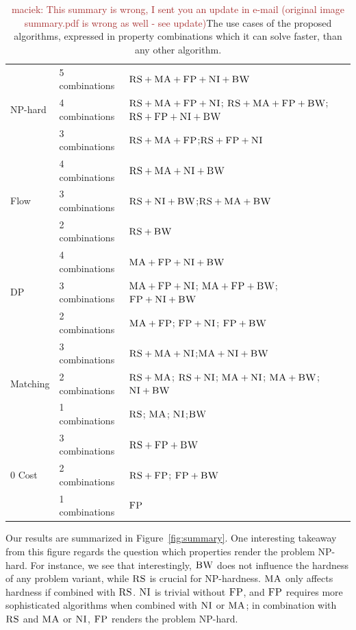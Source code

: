 \documentclass[9pt]{sigcomm-alternate}
\newcommand{\maciek}[1]{\textcolor{brown}{maciek: #1}}
\newcommand{\CC}{\textsc{NI}}
\newcommand{\FP}{\textsc{FP}}
\newcommand{\RS}{\textsc{RS}}
\newcommand{\BW}{\textsc{BW}}
\newcommand{\MA}{\textsc{MA}}
\begin{document}
\begin{table}


\begin{small}
\begin{tabular}{|l|l|p{4cm}|}
\hline
\multirow{3}{*}{NP-hard} & 5 combinations & \mbox{$\RS+\MA+\FP+\CC+\BW$}\\
\cline{2-3}
 & 4 combinations &  \mbox{$\RS+\MA+\FP+\CC$}; \mbox{$\RS+\MA+\FP+\BW$};
\mbox{$\RS+\FP+\CC+\BW$} \\ \cline{2-3}
 & 3 combinations &\mbox{$\RS+\MA+\FP$};\mbox{$\RS+\FP+\CC$} \\
 \hline
 \hline
\multirow{3}{*}{Flow} & 4 combinations & \mbox{$\RS+\MA+\CC+\BW$} \\ \cline{2-3}
 & 3 combinations & \mbox{$\RS+\CC+\BW$};\mbox{$\RS+\MA+\BW$}    \\ \cline{2-3}
 & 2 combinations &$\RS+\BW$ \\
 \hline
 \hline
\multirow{3}{*}{DP} & 4 combinations & \mbox{$\MA+\FP+\CC+\BW$} \\ \cline{2-3}
 & 3 combinations &   \mbox{$\MA+\FP+\CC$};
\mbox{$\MA+\FP+\BW$}; \mbox{$\FP+\CC+\BW$} \\ \cline{2-3}
 & 2 combinations &\mbox{$\MA+\FP$}; \mbox{$\FP+\CC$};
\mbox{$\FP+\BW$} \\
 \hline
 \hline
\multirow{3}{*}{Matching} &3 combinations&
\mbox{$\RS+\MA+\CC$};\mbox{$\MA+\CC+\BW$}  \\
\cline{2-3}
 & 2 combinations & \mbox{$\RS+\MA$};
\mbox{$\RS+\CC$}; \mbox{$\MA+\CC$};
\mbox{$\MA+\BW$};\mbox{$\CC+\BW$} \\ \cline{2-3}
& 1 combinations & \mbox{$\RS$}; \mbox{$\MA$};
\mbox{$\CC$};\mbox{$\BW$}\\
 \hline
 \hline
 \multirow{3}{*}{0 Cost} & 3 combinations & \mbox{$\RS+\FP+\BW$}\\
\cline{2-3}
 & 2 combinations & \mbox{$\RS+\FP$}; \mbox{$\FP+\BW$}
\\ \cline{2-3}
 & 1 combinations & \mbox{$\FP$}\\
 \hline
\end{tabular}
\end{small}
\caption{\maciek{This summary is wrong, I sent you an update in e-mail
  (original image summary.pdf is wrong as well - see update)}The use cases of the proposed algorithms, expressed in property
combinations which it can solve faster, than any other algorithm.}
\label{tab:summary}
\end{table}


Our results are summarized in
Figure~\ref{fig:summary}.
One interesting takeaway from this figure regards
the question which properties render the problem
NP-hard. For instance, we see that interestingly, $\BW$
does not influence the hardness of any problem variant,
while $\RS$ is crucial for NP-hardness.
$\MA$ only affects hardness if combined with $\RS$.
$\CC$ is trivial without $\FP$, and $\FP$ requires
more sophisticated algorithms when combined with $\CC$ or $\MA$;
in combination with $\RS$ and $\MA$ or $\CC$, $\FP$ renders the
problem NP-hard.
\end{document}
